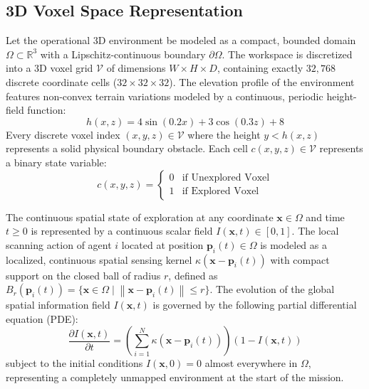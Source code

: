 \documentclass[letterpaper, 10pt, conference]{IEEEtran}
\newcommand{\norm}[1]{\left\lVert#1\right\rVert}
\begin{document}
\subsection{3D Voxel Space Representation}
Let the operational 3D environment be modeled as a compact, bounded domain $\Omega \subset \mathbb{R}^3$ with a Lipschitz-continuous boundary $\partial\Omega$. The workspace is discretized into a 3D voxel grid $\mathcal{V}$ of dimensions $W \times H \times D$, containing exactly $32{,}768$ discrete coordinate cells ($32 \times 32 \times 32$). The elevation profile of the environment features non-convex terrain variations modeled by a continuous, periodic height-field function:
\begin{equation}
    h(x, z) = 4\sin(0.2x) + 3\cos(0.3z) + 8
    \label{eq:heightmap}
\end{equation}
Every discrete voxel index $(x, y, z) \in \mathcal{V}$ where the height $y < h(x, z)$ represents a solid physical boundary obstacle. Each cell $c(x,y,z) \in \mathcal{V}$ represents a binary state variable:
\begin{equation}
    c(x, y, z) = \begin{cases} 
    0 & \text{if Unexplored Voxel} \\ 
    1 & \text{if Explored Voxel} 
    \end{cases}
    \label{eq:voxel_state}
\end{equation}

The continuous spatial state of exploration at any coordinate $\mathbf{x} \in \Omega$ and time $t \geq 0$ is represented by a continuous scalar field $I(\mathbf{x}, t) \in [0, 1]$. The local scanning action of agent $i$ located at position $\mathbf{p}_i(t) \in \Omega$ is modeled as a localized, continuous spatial sensing kernel $\kappa(\mathbf{x} - \mathbf{p}_i(t))$ with compact support on the closed ball of radius $r$, defined as $B_r(\mathbf{p}_i(t)) = \{\mathbf{x} \in \Omega \mid \norm{\mathbf{x} - \mathbf{p}_i(t)} \leq r\}$. The evolution of the global spatial information field $I(\mathbf{x}, t)$ is governed by the following partial differential equation (PDE):
\begin{equation}
    \frac{\partial I(\mathbf{x}, t)}{\partial t} = \left( \sum_{i=1}^N \kappa(\mathbf{x} - \mathbf{p}_i(t)) \right) (1 - I(\mathbf{x}, t))
    \label{eq:pde_field}
\end{equation}
subject to the initial conditions $I(\mathbf{x}, 0) = 0$ almost everywhere in $\Omega$, representing a completely unmapped environment at the start of the mission.
\end{document}
